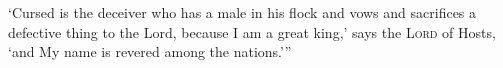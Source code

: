\begin{inparaenum}
   `Cursed is the deceiver who has a male in his flock and vows and sacrifices a defective thing to the Lord, because I am a great king,' says the \textsc{Lord} of Hosts, `and My name is revered among the nations.'\thinspace''%
\end{inparaenum}
